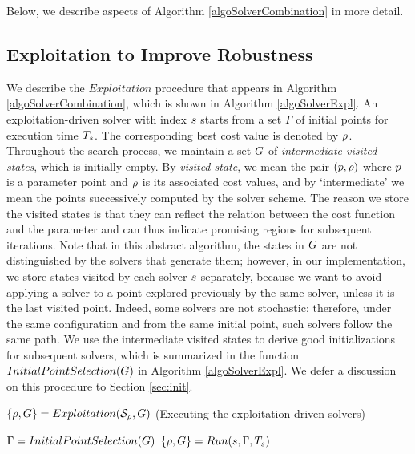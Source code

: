 Below, we describe aspects of Algorithm \ref{algoSolverCombination} in more detail.

\subsection{Exploitation to Improve Robustness}

We describe the $Exploitation$ procedure that appears in Algorithm \ref{algoSolverCombination}, which is shown in Algorithm \ref{algoSolverExpl}. 
An exploitation-driven solver with index $s$ starts from a set $\Gamma$ of initial points for execution time $T_{s}$. The corresponding best cost value is denoted by $\rho$. Throughout the search process, we maintain a set $G$ of {\em intermediate visited states}, which is initially empty. By {\em visited state}, we mean the pair $(p, \rho)$ where $p$ is a parameter point and $\rho$ is its associated cost values, and by `intermediate' we mean the points successively computed by the solver scheme. The reason we store the visited states is that they can reflect the relation between the cost function and the parameter and can thus indicate promising regions for subsequent iterations. Note that in this abstract algorithm, the states in $G$ are not distinguished by the solvers that generate them; however, in our implementation, we store states visited by each solver $s$ separately, because we want to avoid applying a solver to a point explored previously by the same solver, unless it is the last visited point. Indeed, some solvers are not stochastic; therefore, under the same configuration and from the same initial point, such solvers follow the same path. We use the intermediate visited states to derive good initializations for subsequent solvers, which is summarized in the function $InitialPointSelection(G)$ in Algorithm \ref{algoSolverExpl}. We defer a discussion on this procedure to Section \ref{sec:init}.

\begin{algorithm}
\caption{$\{ \rho, G \}=Exploitation(\mathcal{S_{\rho}}, G)$ 
(Executing the exploitation-driven solvers) \label{algoSolverExpl}}
\begin{algorithmic}
		\State {}
		\ForAll{$\solver \in \solversetRho$} 
		\State $\Gamma = InitialPointSelection(G)$
		\State {}
  		\State $\{ \rho, G \} = Run(s, \Gamma, T_{s})$ 
		\EndFor
\end{algorithmic}
\end{algorithm}



